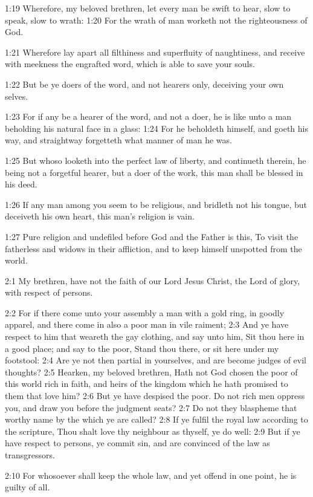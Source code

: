 1:19 Wherefore, my beloved brethren, let every man be swift to hear,
slow to speak, slow to wrath: 1:20 For the wrath of man worketh not
the righteousness of God.

1:21 Wherefore lay apart all filthiness and superfluity of
naughtiness, and receive with meekness the engrafted word, which is
able to save your souls.

1:22 But be ye doers of the word, and not hearers only, deceiving your
own selves.

1:23 For if any be a hearer of the word, and not a doer, he is like
unto a man beholding his natural face in a glass: 1:24 For he
beholdeth himself, and goeth his way, and straightway forgetteth what
manner of man he was.

1:25 But whoso looketh into the perfect law of liberty, and continueth
therein, he being not a forgetful hearer, but a doer of the work, this
man shall be blessed in his deed.

1:26 If any man among you seem to be religious, and bridleth not his
tongue, but deceiveth his own heart, this man's religion is vain.

1:27 Pure religion and undefiled before God and the Father is this, To
visit the fatherless and widows in their affliction, and to keep
himself unspotted from the world.

2:1 My brethren, have not the faith of our Lord Jesus Christ, the Lord
of glory, with respect of persons.

2:2 For if there come unto your assembly a man with a gold ring, in
goodly apparel, and there come in also a poor man in vile raiment; 2:3
And ye have respect to him that weareth the gay clothing, and say unto
him, Sit thou here in a good place; and say to the poor, Stand thou
there, or sit here under my footstool: 2:4 Are ye not then partial in
yourselves, and are become judges of evil thoughts?  2:5 Hearken, my
beloved brethren, Hath not God chosen the poor of this world rich in
faith, and heirs of the kingdom which he hath promised to them that
love him?  2:6 But ye have despised the poor. Do not rich men oppress
you, and draw you before the judgment seats?  2:7 Do not they
blaspheme that worthy name by the which ye are called?  2:8 If ye
fulfil the royal law according to the scripture, Thou shalt love thy
neighbour as thyself, ye do well: 2:9 But if ye have respect to
persons, ye commit sin, and are convinced of the law as transgressors.

2:10 For whosoever shall keep the whole law, and yet offend in one
point, he is guilty of all.


